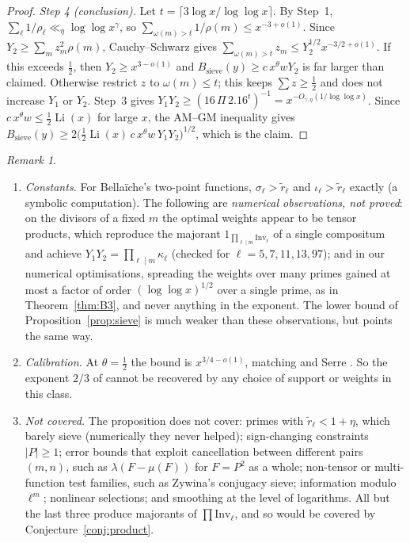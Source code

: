 \documentclass[11pt]{amsart}
\theoremstyle{definition}
\theoremstyle{remark}
\newtheorem{remark}[theorem]{Remark}
\DeclareMathOperator{\Li}{Li}
\newcommand{\Inv}{\mathrm{Inv}}
\begin{document}
\begin{proof}
\emph{Step 4 (conclusion).} Let $t=\lceil3\log x/\log\log x\rceil$. By Step~1,
$\sum_\ell1/\rho_\ell\ll_\eta\log\log x^\gamma$, so $\sum_{\omega(m)>t}1/\rho(m)\le x^{-3+o(1)}$. Since
$Y_2\ge\sum_mz_m^2\rho(m)$, Cauchy--Schwarz gives $\sum_{\omega(m)>t}z_m\le Y_2^{1/2}x^{-3/2+o(1)}$. If this exceeds
$\frac12$, then $Y_2\ge x^{3-o(1)}$ and $B_{\mathrm{sieve}}(y)\ge c\,x^\theta wY_2$ is far larger than claimed. Otherwise
restrict $z$ to $\omega(m)\le t$; this keeps $\sum z\ge\frac12$ and does not increase $Y_1$ or $Y_2$. Step~3 gives
$Y_1Y_2\ge(16\,\Pi\,2.16^t)^{-1}=x^{-O_{\gamma,\eta}(1/\log\log x)}$. Since $c\,x^\theta w\le\frac12\Li(x)$ for large
$x$, the AM--GM inequality gives $B_{\mathrm{sieve}}(y)\ge2\bigl(\tfrac12\Li(x)\,c\,x^\theta w\,Y_1Y_2\bigr)^{1/2}$, which
is the claim.
\end{proof}

\begin{remark}\label{rem:sieve}
\begin{enumerate}[label=(\roman*),leftmargin=*]
\item \emph{Constants.} For Bella\"iche's two-point functions, $\sigma_\ell>\tilde r_\ell$ and $\iota_\ell>\tilde
  r_\ell$ exactly (a symbolic computation). The following are \emph{numerical observations, not proved}: on the
  divisors of a fixed $m$ the optimal weights appear to be tensor products, which reproduce the majorant
  $1_{\prod_{\ell\mid m}\Inv_\ell}$ of a single compositum and achieve $Y_1Y_2=\prod_{\ell\mid m}\kappa_\ell$ (checked
  for $\ell=5,7,11,13,97$); and in our numerical optimisations, spreading the weights over many primes gained at most a
  factor of order $(\log\log x)^{1/2}$ over a single prime, as in Theorem~\ref{thm:B3}, and never anything in the
  exponent. The lower bound of Proposition~\ref{prop:sieve} is much weaker than these observations, but points the
  same way.
\item \emph{Calibration.} At $\theta=\frac12$ the bound is $x^{3/4-o(1)}$, matching \cite[Thm.~14 and Cor.~15]{Bel16}
  and Serre \cite{Serre81}. So the exponent $2/3$ of \cite{Bel13} cannot be recovered by any choice of support or
  weights in this class.
\item \emph{Not covered.} The proposition does not cover: primes with $\tilde r_\ell<1+\eta$, which barely sieve
  (numerically they never helped); sign-changing constraints $|P|\ge1$; error bounds that exploit cancellation between
  different pairs $(m,n)$, such as $\lambda(F-\mu(F))$ for $F=P^2$ as a whole; non-tensor or multi-function test
  families, such as Zywina's conjugacy sieve; information modulo $\ell^m$; nonlinear selections; and smoothing at the
  level of logarithms. All but the last three produce majorants of $\prod\Inv_\ell$, and so would be covered by
  Conjecture~\ref{conj:product}.
\end{enumerate}
\end{remark}
\end{document}
